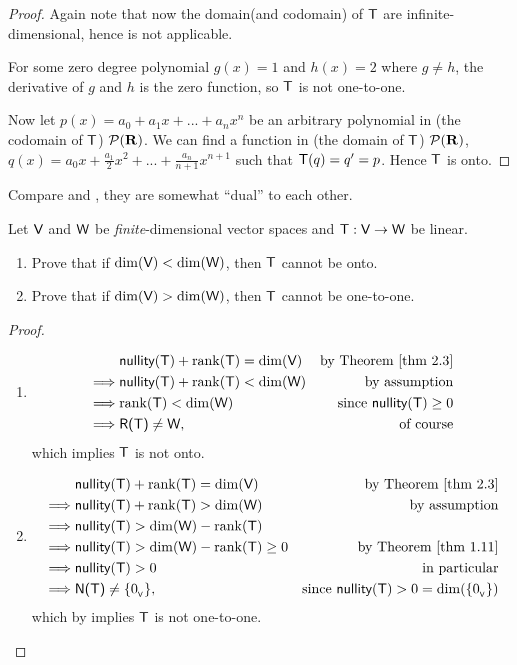 \begin{proof}
Again note that now the domain(and codomain) of \(\textsf{T}\) are infinite-dimensional, hence  is not applicable.

For some zero degree polynomial \(g(x) = 1\) and \(h(x) = 2\) where \(g \ne h\), the derivative of \(g\) and \(h\) is the zero function, so \(\textsf{T}\) is not one-to-one.

Now let \(p(x) = a_0 + a_1 x + ... + a_n x^n\) be an arbitrary polynomial in (the codomain of \(\textsf{T}\)) \(\mathcal{P}(\mathbf{R})\).
We can find a function in (the domain of \(\textsf{T}\)) \(\mathcal{P}(\mathbf{R})\), \(q(x) = a_0 x + \frac{a_1}{2} x^2 + ... + \frac{a_n}{n + 1} x^{n + 1}\) such that \(\textsf{T}(q) = q' = p\).
Hence \(\textsf{T}\) is onto.
\end{proof}

\begin{note}
Compare  and , they are somewhat ``dual'' to each other.
\end{note}

\begin{exercise} \label{exercise 2.1.17}
Let \(\textsf{V}\) and \(\textsf{W}\) be \emph{finite}-dimensional vector spaces and \(\textsf{T}: \textsf{V} \to \textsf{W}\) be linear.
\begin{enumerate}
\item Prove that if \(\dim(\textsf{V}) < \dim(\textsf{W})\), then \(\textsf{T}\) cannot be onto.
\item Prove that if \(\dim(\textsf{V}) > \dim(\textsf{W})\), then \(\textsf{T}\) cannot be one-to-one.
\end{enumerate}
\end{exercise}

\begin{proof} \ 
\begin{enumerate}
\item
\begin{align*}
             & \nullityT + \rankT = \dim(\V) & \text{by \THM{2.3}} \\
    \implies & \nullityT + \rankT < \dim(\W) & \text{by assumption} \\
    \implies & \rankT < \dim(\W) & \text{since \(\nullityT \ge 0\)} \\
    \implies & \RANGET \ne \W, & \text{of course}
\end{align*}
which implies \(\textsf{T}\) is not onto.

\item
\begin{align*}
             & \nullityT + \rankT = \dim(\V) & \text{by \THM{2.3}} \\
    \implies & \nullityT + \rankT > \dim(\W) & \text{by assumption} \\
    \implies & \nullityT > \dim(\W) - \rankT \\
    \implies & \nullityT > \dim(\W) - \rankT \ge 0 & \text{by \THM{1.11}} \\
    \implies & \nullityT > 0 & \text{in particular} \\
    \implies & \NULLT \ne \{ \OV \}, & \text{since \(\nullityT > 0 = \dim(\{ \OV \})\)}
\end{align*}
which by  implies \(\textsf{T}\) is not one-to-one.
\end{enumerate}
\end{proof}


